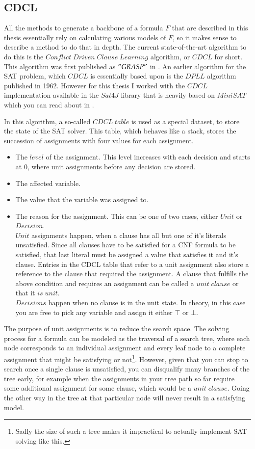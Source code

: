 \subsection{CDCL}
\label{ss:cdcl}
All the methods to generate a backbone of a formula $F$ that are described in this thesis essentially rely on calculating various models of $F$, so it makes sense to describe a method to do that in depth. The current state-of-the-art algorithm to do this is the $Conflict\;Driven\;Clause\;Learning$ algorithm, or $CDCL$ for short. This algorithm was first published as $"GRASP"$ in \cite{GRASP}. An earlier algorithm for the SAT problem, which $CDCL$ is essentially based upon is the $DPLL$ algorithm \cite{dpll} published in 1962. However for this thesis I worked with the $CDCL$ implementation available in the $Sat4J$ library that is heavily based on $MiniSAT$ which you can read about in \cite{minisat}.

In this algorithm, a so-called $CDCL\;table$ is used as a special dataset, to store the state of the SAT solver. This table, which behaves like a stack, stores the succession of assignments with four values for each assignment.
\begin{itemize}
\item The $level$ of the assignment. This level increases with each decision and starts at 0, where unit assignments before any decision are stored.
\item The affected variable.
\item The value that the variable was assigned to.
\item The reason for the assignment. This can be one of two cases, either $Unit$ or $Decision$. 
\\
$Unit$ assignments happen, when a clause has all but one of it's literals unsatisfied. Since all clauses have to be satisfied for a CNF formula to be satisfied, that last literal must be assigned a value that satisfies it and it's clause. Entries in the CDCL table that refer to a unit assignment also store a reference to the clause that required the assignment. A clause that fulfills the above condition and requires an assignment can be called a $unit\; clause$ or that it $is\; unit$.
\\
$Decisions$ happen when no clause is in the unit state. In theory, in this case you are free to pick any variable and assign it either $\top$ or $\bot$. 
\end{itemize}

The purpose of unit assignments is to reduce the search space. The solving process for a formula can be modeled as the traversal of a search tree, where each node corresponds to an individual assignment and every leaf node to a complete assignment that might be satisfying or not\footnote
{
	Sadly the size of such a tree makes it impractical to actually implement SAT solving like this.
}. However, given that you can stop to search once a single clause is unsatisfied, you can disqualify many branches of the tree early, for example when the assignments in your tree path so far require some additional assignment for some clause, which would be a $unit\; clause$. Going the other way in the tree at that particular node will never result in a satisfying model.

